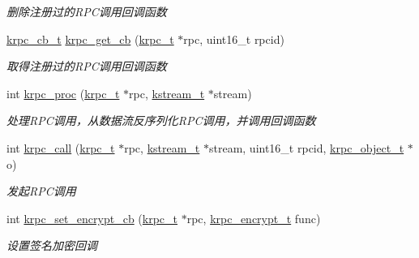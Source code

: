 \begin{DoxyCompactItemize}
\begin{DoxyCompactList}\small\item\em 删除注册过的\+R\+P\+C调用回调函数 \end{DoxyCompactList}\item 
\hyperlink{a00056_a06bb708c1b97445d3a5d0c1b32ad2ab6_a06bb708c1b97445d3a5d0c1b32ad2ab6}{krpc\+\_\+cb\+\_\+t} \hyperlink{a00094_a7841a0b4c828efcb607a51bbdd9c9ab1_a7841a0b4c828efcb607a51bbdd9c9ab1}{krpc\+\_\+get\+\_\+cb} (\hyperlink{a00056_a1e414ac6f6de24462ccf81e10f63428d_a1e414ac6f6de24462ccf81e10f63428d}{krpc\+\_\+t} $\ast$rpc, uint16\+\_\+t rpcid)
\begin{DoxyCompactList}\small\item\em 取得注册过的\+R\+P\+C调用回调函数 \end{DoxyCompactList}\item 
int \hyperlink{a00094_ac583f7d7c3e3ecb9954530e8d0f6f5f1_ac583f7d7c3e3ecb9954530e8d0f6f5f1}{krpc\+\_\+proc} (\hyperlink{a00056_a1e414ac6f6de24462ccf81e10f63428d_a1e414ac6f6de24462ccf81e10f63428d}{krpc\+\_\+t} $\ast$rpc, \hyperlink{a00056_acc208c4c40c875eebbfef88f00fffacf_acc208c4c40c875eebbfef88f00fffacf}{kstream\+\_\+t} $\ast$stream)
\begin{DoxyCompactList}\small\item\em 处理\+R\+P\+C调用，从数据流反序列化\+R\+P\+C调用，并调用回调函数 \end{DoxyCompactList}\item 
int \hyperlink{a00094_a063313e66bd9a479b4d0a6295a5e665b_a063313e66bd9a479b4d0a6295a5e665b}{krpc\+\_\+call} (\hyperlink{a00056_a1e414ac6f6de24462ccf81e10f63428d_a1e414ac6f6de24462ccf81e10f63428d}{krpc\+\_\+t} $\ast$rpc, \hyperlink{a00056_acc208c4c40c875eebbfef88f00fffacf_acc208c4c40c875eebbfef88f00fffacf}{kstream\+\_\+t} $\ast$stream, uint16\+\_\+t rpcid, \hyperlink{a00056_a9c07dfc8c3b965f75b09f82fdb1bbb1e_a9c07dfc8c3b965f75b09f82fdb1bbb1e}{krpc\+\_\+object\+\_\+t} $\ast$o)
\begin{DoxyCompactList}\small\item\em 发起\+R\+P\+C调用 \end{DoxyCompactList}\item 
int \hyperlink{a00094_a5317bb571cb4d94bc56b83989c1b10c2_a5317bb571cb4d94bc56b83989c1b10c2}{krpc\+\_\+set\+\_\+encrypt\+\_\+cb} (\hyperlink{a00056_a1e414ac6f6de24462ccf81e10f63428d_a1e414ac6f6de24462ccf81e10f63428d}{krpc\+\_\+t} $\ast$rpc, \hyperlink{a00056_ae41a67cc07f8dff897ca978e03b1f2d7_ae41a67cc07f8dff897ca978e03b1f2d7}{krpc\+\_\+encrypt\+\_\+t} func)
\begin{DoxyCompactList}\small\item\em 设置签名加密回调 \end{DoxyCompactList}\item 

\end{DoxyCompactItemize}
